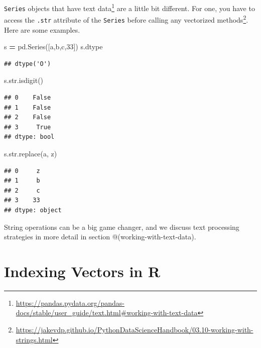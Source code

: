 \documentclass[
  12pt,
]{krantz}
\makeatletter
\newenvironment{Shaded}{\begin{snugshade}}{\end{snugshade}}
\newcommand{\BuiltInTok}[1]{#1}
\newcommand{\NormalTok}[1]{#1}
\newcommand{\OperatorTok}[1]{\textcolor[rgb]{0.43,0.43,0.43}{\textbf{#1}}}
\newcommand{\StringTok}[1]{\textcolor[rgb]{0.5,0.5,0.5}{#1}}
\renewcommand{\href}[2]{#2\footnote{\url{#1}}}
\newenvironment{kframe}{%
\medskip{}
\setlength{\fboxsep}{.8em}
 \def\at@end@of@kframe{}%
 \ifinner\ifhmode%
  \def\at@end@of@kframe{\end{minipage}}%
  \begin{minipage}{\columnwidth}%
 \fi\fi%
 \def\FrameCommand##1{\hskip\@totalleftmargin \hskip-\fboxsep
 \colorbox{shadecolor}{##1}\hskip-\fboxsep
     \hskip-\linewidth \hskip-\@totalleftmargin \hskip\columnwidth}%
 \MakeFramed {\advance\hsize-\width
   \@totalleftmargin\z@ \linewidth\hsize
   \@setminipage}}%
 {\par\unskip\endMakeFramed%
 \at@end@of@kframe}
\renewenvironment{Shaded}{\begin{kframe}}{\end{kframe}}
\makeatother
\begin{document}
\texttt{Series} objects that have \href{https://pandas.pydata.org/pandas-docs/stable/user_guide/text.html\#working-with-text-data}{text data} are a little bit different. For one, you have to access the \texttt{.str} attribute of the \texttt{Series} before calling any \href{https://jakevdp.github.io/PythonDataScienceHandbook/03.10-working-with-strings.html}{vectorized methods}. Here are some examples.

\begin{Shaded}
\begin{Highlighting}[]
\NormalTok{s }\OperatorTok{=}\NormalTok{ pd.Series([}\StringTok{\textquotesingle{}a\textquotesingle{}}\NormalTok{,}\StringTok{\textquotesingle{}b\textquotesingle{}}\NormalTok{,}\StringTok{\textquotesingle{}c\textquotesingle{}}\NormalTok{,}\StringTok{\textquotesingle{}33\textquotesingle{}}\NormalTok{])}
\NormalTok{s.dtype}
\end{Highlighting}
\end{Shaded}

\begin{verbatim}
## dtype('O')
\end{verbatim}

\begin{Shaded}
\begin{Highlighting}[]
\NormalTok{s.}\BuiltInTok{str}\NormalTok{.isdigit()}
\end{Highlighting}
\end{Shaded}

\begin{verbatim}
## 0    False
## 1    False
## 2    False
## 3     True
## dtype: bool
\end{verbatim}

\begin{Shaded}
\begin{Highlighting}[]
\NormalTok{s.}\BuiltInTok{str}\NormalTok{.replace(}\StringTok{\textquotesingle{}a\textquotesingle{}}\NormalTok{, }\StringTok{\textquotesingle{}z\textquotesingle{}}\NormalTok{)}
\end{Highlighting}
\end{Shaded}

\begin{verbatim}
## 0     z
## 1     b
## 2     c
## 3    33
## dtype: object
\end{verbatim}

String operations can be a big game changer, and we discuss text processing strategies in more detail in section @(working-with-text-data).

\hypertarget{indexing-vectors-in-r}{%
\section{Indexing Vectors in R}\label{indexing-vectors-in-r}}
\end{document}
